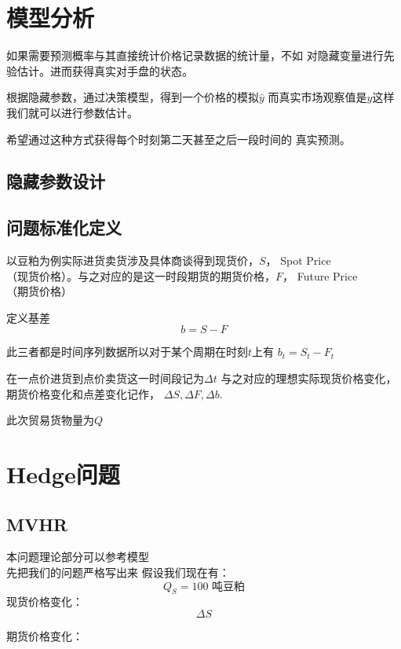 



\section{模型分析}
如果需要预测概率与其直接统计价格记录数据的统计量，不如
对隐藏变量进行先验估计。进而获得真实对手盘的状态。

根据隐藏参数，通过决策模型，得到一个价格的模拟$\hat{y}$
而真实市场观察值是$y$这样我们就可以进行参数估计。

希望通过这种方式获得每个时刻第二天甚至之后一段时间的
真实预测。


\subsection{隐藏参数设计}


\subsection{问题标准化定义}
以豆粕为例实际进货卖货涉及具体商谈得到现货价，$S$，
Spot Price\\
（现货价格）。与之对应的是这一时段期货的期货价格，$F$，
Future Price\\
（期货价格）

定义基差
$$
    b=S-F
$$

此三者都是时间序列数据所以对于某个周期在时刻$t$上有
$b_t=S_t-F_t$

在一点价进货到点价卖货这一时间段记为$\Delta t$
与之对应的理想实际现货价格变化，期货价格变化和点差变化记作，
$\Delta S,\Delta F, \Delta b$.

此次贸易货物量为$Q$




\section{Hedge问题}


\subsection{MVHR}
本问题理论部分可以参考\cite[MVHR]{MVHR}模型\\
先把我们的问题严格写出来
假设我们现在有：
$$
    Q_S=100\text{ 吨豆粕}
$$
现货价格变化：
$$
    \Delta S
$$

期货价格变化：

